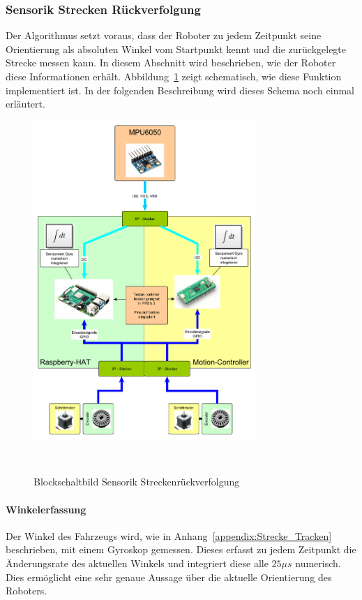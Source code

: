 \documentclass[main.tex]{subfiles} %
\begin{document}

\subsubsection{Sensorik Strecken Rückverfolgung}

Der Algorithmus setzt voraus, dass der Roboter zu jedem Zeitpunkt seine
Orientierung als absoluten Winkel vom Startpunkt kennt und die zurückgelegte
Strecke messen kann. In diesem Abschnitt wird beschrieben, wie der Roboter
diese Informationen erhält. Abbildung~\ref{fig:Blockschaltbild_StreckenTracken}
zeigt schematisch, wie diese Funktion implementiert ist. In der folgenden
Beschreibung wird dieses Schema noch einmal erläutert.

\begin{figure}[H]
    \centering
    \includegraphics[width=0.75\textwidth]{./fig_Strecke_Tracken/Topologie_MPU6050.pdf}
    \caption{Blockschaltbild Sensorik Streckenrückverfolgung}~\label{fig:Blockschaltbild_StreckenTracken}
\end{figure}

\paragraph{Winkelerfassung}
Der Winkel des Fahrzeugs wird, wie in Anhang~\ref{appendix:Strecke_Tracken}
beschrieben, mit einem Gyroskop gemessen. Dieses erfasst zu jedem Zeitpunkt die
Änderungsrate des aktuellen Winkels und integriert diese alle $25\mu s$
numerisch. Dies ermöglicht eine sehr genaue Aussage über die aktuelle
Orientierung des Roboters.
\end{document}
